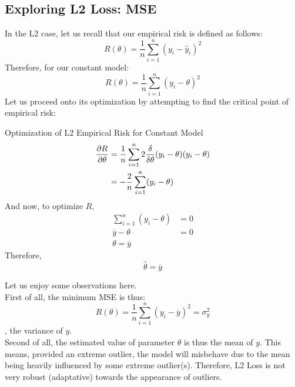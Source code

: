 \subsection{Exploring L2 Loss: MSE}
In the L2 case, let us recall that our empirical risk is defined as follows:
\[R(\theta) = \frac{1}{n} \sum_{i = 1}^n {(y_i - \hat{y}_i)}^2\]
Therefore, for our constant model:
\[R(\theta) = \frac{1}{n} \sum_{i = 1}^n {(y_i - \theta)}^2\]
Let us proceed onto its optimization by attempting to find the critical point of empirical risk:
\begin{ln-derive}{Optimization of L2 Empirical Risk for Constant Model}{}
    \begin{align*}
        \pdv{R}{\theta}
        &= \frac{1}{n} \sum_{i = 1}^n 2\frac{\delta}{\delta \theta}(y_i - \theta){(y_i - \theta)} \\
        &= -\frac{2}{n} \sum_{i = 1}^n (y_i - \theta)
    \end{align*}
    And now, to optimize $R$,
    \begin{align*}
        \sum_{i = 1}^n (y_i - \theta) &= 0 \\
        \overline{y} - \theta &= 0 \\
        \theta = \overline{y}
    \end{align*}
    Therefore, 
    \[\hat{\theta} = \overline{y}\]
\end{ln-derive}
Let us enjoy some observations here. \\
First of all, the minimum MSE is thus:
\[R(\theta) = \frac{1}{n} \sum_{i = 1}^n {(y_i - \overline{y})}^2 = \sigma_y^2\]
, the variance of $y$. \\
Second of all, the estimated value of parameter $\theta$ is thus the mean of $y$. This means, provided an extreme outlier, the model will misbehave due to the mean being heavily influenced by some extreme outlier(s). Therefore, L2 Loss is not very robust (adaptative) towards the appearance of outliers. \\

